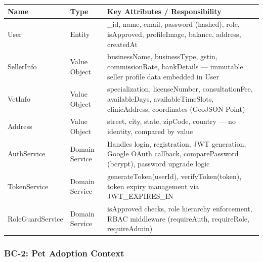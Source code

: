 \documentclass[12pt,a4paper]{article}
\begin{document}
\begin{center}
\begin{tabular}{@{}p{3.5cm}p{2cm}p{8.5cm}@{}}
\toprule
\textbf{Name} & \textbf{Type} & \textbf{Key Attributes / Responsibility} \\
\midrule
User & Entity & \_id, name, email, password (hashed), role, isApproved, profileImage, balance, address, createdAt \\
SellerInfo & Value Object & businessName, businessType, gstin, commissionRate, bankDetails — immutable seller profile data embedded in User \\
VetInfo & Value Object & specialization, licenseNumber, consultationFee, availableDays, availableTimeSlots, clinicAddress, coordinates (GeoJSON Point) \\
Address & Value Object & street, city, state, zipCode, country — no identity, compared by value \\
AuthService & Domain Service & Handles login, registration, JWT generation, Google OAuth callback, comparePassword (bcrypt), password upgrade logic \\
TokenService & Domain Service & generateToken(userId), verifyToken(token), token expiry management via JWT\_EXPIRES\_IN \\
RoleGuardService & Domain Service & isApproved checks, role hierarchy enforcement, RBAC middleware (requireAuth, requireRole, requireAdmin) \\
\bottomrule
\end{tabular}
\end{center}

\subsubsection{BC-2: Pet Adoption Context}
\end{document}
